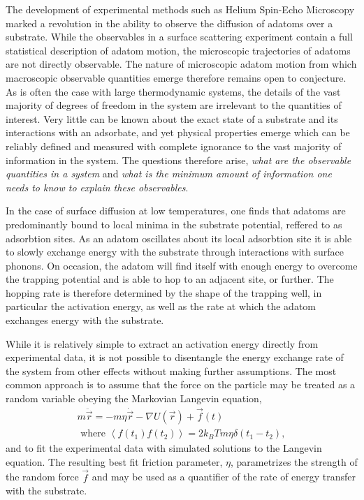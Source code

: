 \documentclass[7pt]{article}
\title{}
\author{Jeremy Wilkinson}
\date{September 2021}
\begin{document}
\maketitle

The development of experimental methods such as Helium Spin-Echo Microscopy marked a revolution in the ability to observe the diffusion of adatoms over a substrate\cite{FouquetHSEM, JardineHSEM}. While the observables in a surface scattering experiment contain a full statistical description of adatom motion\cite{vanHowe}, the microscopic trajectories of adatoms are not directly observable. The nature of microscopic adatom motion from which macroscopic observable quantities emerge therefore remains open to conjecture. As is often the case with large thermodynamic systems, the details of the vast majority of degrees of freedom in the system are irrelevant to the quantities of interest. Very little can be known about the exact state of a substrate and its interactions with an adsorbate, and yet physical properties emerge which can be reliably defined and measured with complete ignorance to the vast majority of information in the system. The questions therefore arise, \emph{what are the observable quantities in a system} and \emph{what is the minimum amount of information one needs to know to explain these observables}. 

In the case of surface diffusion at low temperatures, one finds that adatoms are predominantly bound to local minima in the substrate potential, reffered to as adsorbtion sites. As an adatom oscillates about its local adsorbtion site it is able to slowly exchange energy with the substrate through interactions with surface phonons. On occasion, the adatom will find itself with enough energy to overcome the trapping potential and is able to hop to an adjacent site, or further. The hopping rate is therefore determined by the shape of the trapping well, in particular the activation energy, as well as the rate at which the adatom exchanges energy with the substrate.

While it is relatively simple to extract an activation energy directly from experimental data\cite{someone}, it is not possible to disentangle the energy exchange rate of the system from other effects without making further assumptions. The most common approach is to assume that the force on the particle may be treated as a random variable obeying the Markovian Langevin equation,
\begin{equation}
\begin{gathered}
	m\ddot{\vec{r}}=-m\eta\dot{\vec{r}}-\nabla U(\vec{r})+\vec{f}(t) \\ 
	\text{ where } \left<f(t_1)f(t_2)\right>=2k_BTm\eta\delta(t_1-t_2),
\end{gathered}
	\label{eq:langevin}
\end{equation}
and to fit the experimental data with simulated solutions to the Langevin equation. The resulting best fit friction parameter, $\eta$, parametrizes the strength of the random force $\vec{f}$ and may be used as a quantifier of the rate of energy transfer with the substrate.
\end{document}
